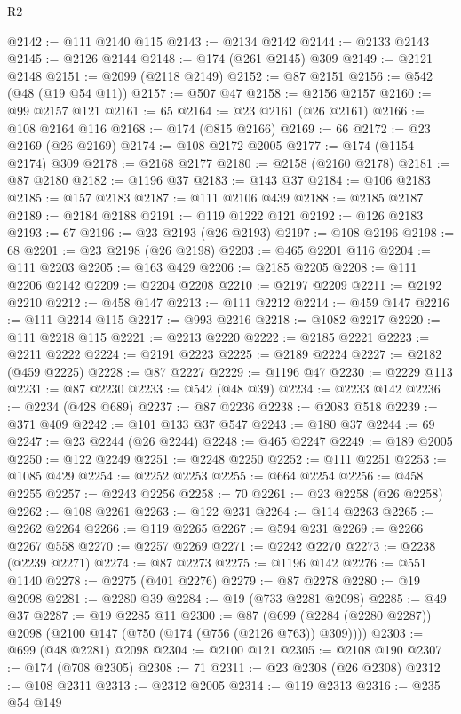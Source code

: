 \begin{lexlean}{R2}
\begin{coremodule}
@2142 := @111 @2140 @115
@2143 := @2134 @2142
@2144 := @2133 @2143
@2145 := @2126 @2144
@2148 := @174 (@261 @2145) @309
@2149 := @2121 @2148
@2151 := @2099 (@2118 @2149)
@2152 := @87 @2151
@2156 := @542 (@48 (@19 @54 @11))
@2157 := @507 @47
@2158 := @2156 @2157
@2160 := @99 @2157 @121
@2161 := 65
@2164 := @23 @2161 (@26 @2161)
@2166 := @108 @2164 @116
@2168 := @174 (@815 @2166)
@2169 := 66
@2172 := @23 @2169 (@26 @2169)
@2174 := @108 @2172 @2005
@2177 := @174 (@1154 @2174) @309
@2178 := @2168 @2177
@2180 := @2158 (@2160 @2178)
@2181 := @87 @2180
@2182 := @1196 @37
@2183 := @143 @37
@2184 := @106 @2183
@2185 := @157 @2183
@2187 := @111 @2106 @439
@2188 := @2185 @2187
@2189 := @2184 @2188
@2191 := @119 @1222 @121
@2192 := @126 @2183
@2193 := 67
@2196 := @23 @2193 (@26 @2193)
@2197 := @108 @2196
@2198 := 68
@2201 := @23 @2198 (@26 @2198)
@2203 := @465 @2201 @116
@2204 := @111 @2203
@2205 := @163 @429
@2206 := @2185 @2205
@2208 := @111 @2206 @2142
@2209 := @2204 @2208
@2210 := @2197 @2209
@2211 := @2192 @2210
@2212 := @458 @147
@2213 := @111 @2212
@2214 := @459 @147
@2216 := @111 @2214 @115
@2217 := @993 @2216
@2218 := @1082 @2217
@2220 := @111 @2218 @115
@2221 := @2213 @2220
@2222 := @2185 @2221
@2223 := @2211 @2222
@2224 := @2191 @2223
@2225 := @2189 @2224
@2227 := @2182 (@459 @2225)
@2228 := @87 @2227
@2229 := @1196 @47
@2230 := @2229 @113
@2231 := @87 @2230
@2233 := @542 (@48 @39)
@2234 := @2233 @142
@2236 := @2234 (@428 @689)
@2237 := @87 @2236
@2238 := @2083 @518
@2239 := @371 @409
@2242 := @101 @133 @37 @547
@2243 := @180 @37
@2244 := 69
@2247 := @23 @2244 (@26 @2244)
@2248 := @465 @2247
@2249 := @189 @2005
@2250 := @122 @2249
@2251 := @2248 @2250
@2252 := @111 @2251
@2253 := @1085 @429
@2254 := @2252 @2253
@2255 := @664 @2254
@2256 := @458 @2255
@2257 := @2243 @2256
@2258 := 70
@2261 := @23 @2258 (@26 @2258)
@2262 := @108 @2261
@2263 := @122 @231
@2264 := @114 @2263
@2265 := @2262 @2264
@2266 := @119 @2265
@2267 := @594 @231
@2269 := @2266 @2267 @558
@2270 := @2257 @2269
@2271 := @2242 @2270
@2273 := @2238 (@2239 @2271)
@2274 := @87 @2273
@2275 := @1196 @142
@2276 := @551 @1140
@2278 := @2275 (@401 @2276)
@2279 := @87 @2278
@2280 := @19 @2098
@2281 := @2280 @39
@2284 := @19 (@733 @2281 @2098)
@2285 := @49 @37
@2287 := @19 @2285 @11
@2300 := @87 (@699 (@2284 (@2280 @2287)) @2098 (@2100 @147 (@750 (@174 (@756 (@2126 @763)) @309))))
@2303 := @699 (@48 @2281) @2098
@2304 := @2100 @121
@2305 := @2108 @190
@2307 := @174 (@708 @2305)
@2308 := 71
@2311 := @23 @2308 (@26 @2308)
@2312 := @108 @2311
@2313 := @2312 @2005
@2314 := @119 @2313
@2316 := @235 @54 @149

\end{coremodule}
\end{lexlean}
